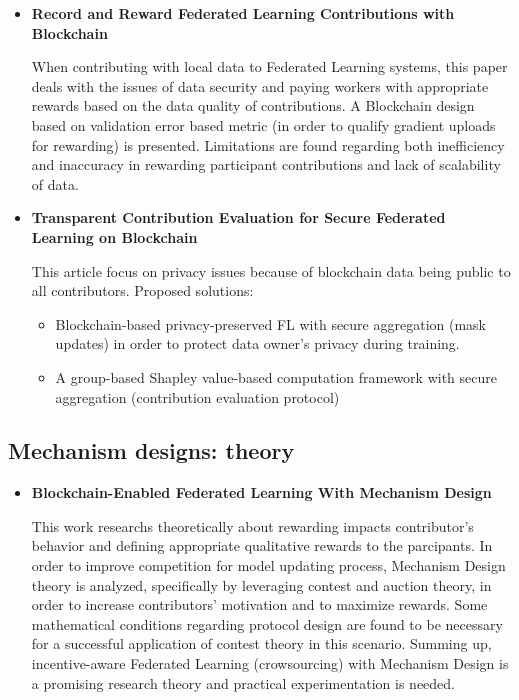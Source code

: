 \begin{frame}
\begin{itemize}
\item \textbf{Record and Reward Federated Learning Contributions with Blockchain\cite{martinez_record_2019}}

When contributing with local data to Federated Learning systems, this paper deals with the issues of data security and paying workers with appropriate rewards based on the data quality of contributions. A Blockchain design based on validation error based metric (in order to qualify gradient uploads for rewarding) is presented. Limitations are found regarding both inefficiency and inaccuracy in rewarding participant contributions and lack of scalability of data.

\item \textbf{Transparent Contribution Evaluation for Secure Federated Learning on Blockchain\cite{ma_transparent_2021}}

This article focus on privacy issues because of blockchain data being public to all contributors. Proposed solutions:
\begin{itemize}
\item Blockchain-based privacy-preserved FL with secure aggregation (mask updates) in order to protect data owner's privacy during training.
\item A group-based Shapley value-based computation framework with secure aggregation (contribution evaluation protocol)
\end{itemize}
\end{itemize}

\end{frame}

\subsection{Mechanism designs: theory}

\begin{frame}
\begin{itemize}
\item \textbf{Blockchain-Enabled Federated Learning With Mechanism Design\cite{toyoda_blockchain-enabled_2020}}

This work researchs theoretically about rewarding impacts contributor's behavior and defining appropriate qualitative rewards to the parcipants. In order to improve competition for model updating process, Mechanism Design theory is analyzed, specifically by leveraging contest and auction theory, in order to increase contributors' motivation and to maximize rewards. Some mathematical conditions regarding protocol design are found to be necessary for a successful application of contest theory in this scenario.
Summing up, incentive-aware Federated Learning (crowsourcing) with Mechanism Design is a promising research theory and practical experimentation is needed.

\end{itemize}

\end{frame}
